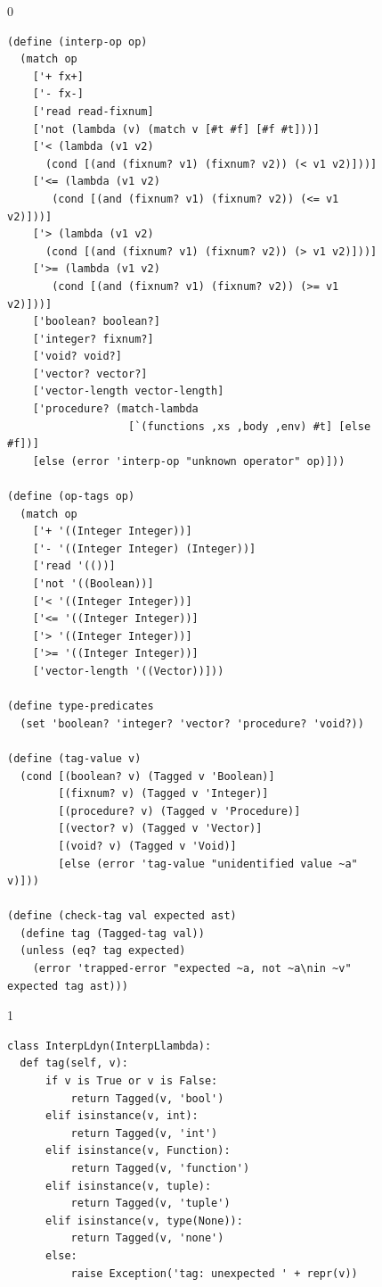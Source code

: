 \documentclass[7x10]{TimesAPriori_MIT}%
\def\racketEd{0}
\def\pythonEd{1}
\def\edition{1}
\newcommand{\pythonColor}[0]{}
\numberwithin{theorem}{chapter}
\numberwithin{definition}{chapter}
\numberwithin{equation}{chapter}
\begin{document}
\begin{figure}[tbp]
  \begin{tcolorbox}[colback=white]
    {\if\edition\racketEd
\begin{lstlisting}[basicstyle=\ttfamily\footnotesize]
(define (interp-op op)
  (match op
    ['+ fx+]
    ['- fx-]
    ['read read-fixnum]
    ['not (lambda (v) (match v [#t #f] [#f #t]))]
    ['< (lambda (v1 v2)
	  (cond [(and (fixnum? v1) (fixnum? v2)) (< v1 v2)]))]
    ['<= (lambda (v1 v2)
	   (cond [(and (fixnum? v1) (fixnum? v2)) (<= v1 v2)]))]
    ['> (lambda (v1 v2)
	  (cond [(and (fixnum? v1) (fixnum? v2)) (> v1 v2)]))]
    ['>= (lambda (v1 v2)
	   (cond [(and (fixnum? v1) (fixnum? v2)) (>= v1 v2)]))]
    ['boolean? boolean?]
    ['integer? fixnum?]
    ['void? void?]
    ['vector? vector?]
    ['vector-length vector-length]
    ['procedure? (match-lambda
                   [`(functions ,xs ,body ,env) #t] [else #f])]
    [else (error 'interp-op "unknown operator" op)]))

(define (op-tags op)
  (match op
    ['+ '((Integer Integer))]
    ['- '((Integer Integer) (Integer))]
    ['read '(())]
    ['not '((Boolean))]
    ['< '((Integer Integer))]
    ['<= '((Integer Integer))]
    ['> '((Integer Integer))]
    ['>= '((Integer Integer))]
    ['vector-length '((Vector))]))

(define type-predicates
  (set 'boolean? 'integer? 'vector? 'procedure? 'void?))

(define (tag-value v)
  (cond [(boolean? v) (Tagged v 'Boolean)]
        [(fixnum? v) (Tagged v 'Integer)]
        [(procedure? v) (Tagged v 'Procedure)]
        [(vector? v) (Tagged v 'Vector)]
        [(void? v) (Tagged v 'Void)]
        [else (error 'tag-value "unidentified value ~a" v)]))

(define (check-tag val expected ast)
  (define tag (Tagged-tag val))
  (unless (eq? tag expected)
    (error 'trapped-error "expected ~a, not ~a\nin ~v" expected tag ast)))
\end{lstlisting}
\fi}
{\if\edition\pythonEd\pythonColor
\begin{lstlisting}[basicstyle=\ttfamily\footnotesize]
class InterpLdyn(InterpLlambda):
  def tag(self, v):
      if v is True or v is False:
          return Tagged(v, 'bool')
      elif isinstance(v, int):
          return Tagged(v, 'int')
      elif isinstance(v, Function):
          return Tagged(v, 'function')
      elif isinstance(v, tuple):
          return Tagged(v, 'tuple')
      elif isinstance(v, type(None)):
          return Tagged(v, 'none')
      else:
          raise Exception('tag: unexpected ' + repr(v))


\end{lstlisting}}
\end{tcolorbox}
\end{figure}
\end{document}
